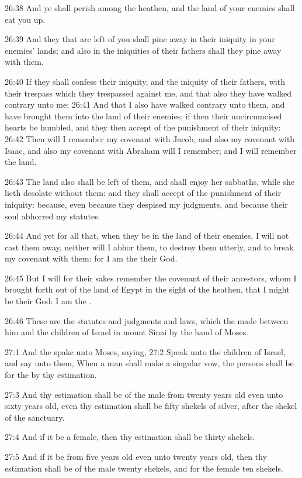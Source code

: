 26:38 And ye shall perish among the heathen, and the land of your
enemies shall eat you up.

26:39 And they that are left of you shall pine away in their iniquity
in your enemies' lands; and also in the iniquities of their fathers
shall they pine away with them.

26:40 If they shall confess their iniquity, and the iniquity of their
fathers, with their trespass which they trespassed against me, and
that also they have walked contrary unto me; 26:41 And that I also
have walked contrary unto them, and have brought them into the land of
their enemies; if then their uncircumcised hearts be humbled, and they
then accept of the punishment of their iniquity: 26:42 Then will I
remember my covenant with Jacob, and also my covenant with Isaac, and
also my covenant with Abraham will I remember; and I will remember the
land.

26:43 The land also shall be left of them, and shall enjoy her
sabbaths, while she lieth desolate without them: and they shall accept
of the punishment of their iniquity: because, even because they
despised my judgments, and because their soul abhorred my statutes.

26:44 And yet for all that, when they be in the land of their enemies,
I will not cast them away, neither will I abhor them, to destroy them
utterly, and to break my covenant with them: for I am the \LORD their
God.

26:45 But I will for their sakes remember the covenant of their
ancestors, whom I brought forth out of the land of Egypt in the sight
of the heathen, that I might be their God: I am the \LORD.

26:46 These are the statutes and judgments and laws, which the \LORD
made between him and the children of Israel in mount Sinai by the hand
of Moses.

27:1 And the \LORD spake unto Moses, saying, 27:2 Speak unto the
children of Israel, and say unto them, When a man shall make a
singular vow, the persons shall be for the \LORD by thy estimation.

27:3 And thy estimation shall be of the male from twenty years old
even unto sixty years old, even thy estimation shall be fifty shekels
of silver, after the shekel of the sanctuary.

27:4 And if it be a female, then thy estimation shall be thirty
shekels.

27:5 And if it be from five years old even unto twenty years old, then
thy estimation shall be of the male twenty shekels, and for the female
ten shekels.

